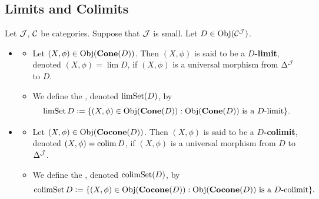 \documentclass{book}
\begin{document}
	
	
	
	
	
	
	
	
	\subsection{Limits and Colimits}
	
	\begin{defn} 
		Let $\mathcal{J}$, $\mathcal{C}$ be categories. Suppose that $\mathcal{J}$ is small. Let $D \in \operatorname{Obj}(\mathcal{C}^{\mathcal{J}})$. 
		\begin{itemize}
			\item 
			\begin{itemize}
				\item Let $(X, \phi) \in \operatorname{Obj}(\operatorname*{\text{\textbf{Cone}}}(D))$. Then $(X, \phi)$ is said to be a \textbf{$D$-limit}, denoted $(X, \phi) = \lim D$, if $(X, \phi)$ is a universal morphism from $\Delta^{\mathcal{J}}$ to $D$.  
				\item We define the , denoted $\operatorname{limSet}(D)$, by 
				$$\operatorname{limSet} D \vcentcolon= \{(X, \phi) \in \operatorname{Obj}(\operatorname*{\text{\textbf{Cone}}}(D)): \text{$\operatorname{Obj}(\operatorname*{\text{\textbf{Cone}}}(D))$ is a $D$-limit}\}.$$
			\end{itemize}
			\item 
			\begin{itemize}
				\item Let $(X, \phi) \in \operatorname{Obj}(\operatorname*{\text{\textbf{Cocone}}}(D))$. Then $(X, \phi)$ is said to be a \textbf{$D$-colimit}, denoted $(X, \phi) = \operatorname{colim} D$, if $(X, \phi)$ is a universal morphism from $D$ to $\Delta^{\mathcal{J}}$.  
				\item We define the , denoted $\operatorname{colimSet}(D)$, by 
				$$\operatorname{colimSet} D \vcentcolon= \{(X, \phi) \in \operatorname{Obj}(\operatorname*{\text{\textbf{Cocone}}}(D)): \text{$\operatorname{Obj}(\operatorname*{\text{\textbf{Cocone}}}(D))$ is a $D$-colimit}\}.$$
			\end{itemize}
		\end{itemize}
	\end{defn}
\end{document}
